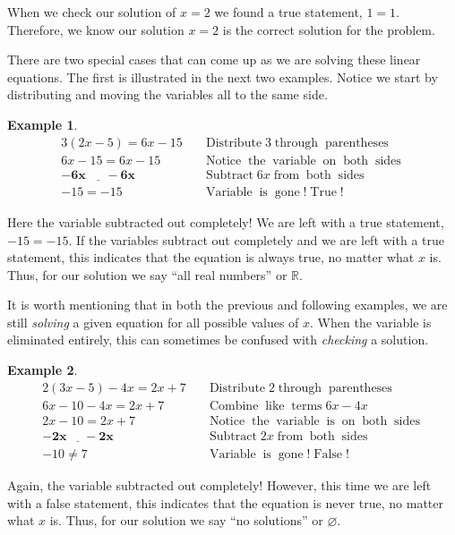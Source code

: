 \documentclass[12pt]{book}
\theoremstyle{definition}
\newtheorem{example}{Example}
\newcommand{\tmmathbf}[1]{\ensuremath{\boldsymbol{#1}}}
\newcommand{\tmop}[1]{\ensuremath{\operatorname{#1}}}
\begin{document}
When we check our solution of $x = 2$ we found a true statement, $1 = 1$. Therefore, we know our solution $x = 2$ is the correct solution for the problem.\par
There are two special cases that can come up as we are solving these linear equations. The first is illustrated in the next two examples. Notice we start by distributing and moving the variables all to the same side.\par
\begin{example}\label{Lin27}
  \begin{eqnarray*}
    3 (2 x - 5) = 6 x - 15 &  & \tmop{Distribute} 3 \tmop{through}
    \tmop{parentheses}\\
    6 x - 15 = 6 x - 15 &  & \tmop{Notice} \tmop{the} \tmop{variable}
    \tmop{on} \tmop{both} \tmop{sides}\\
    \tmmathbf{\underline{- 6 x ~~~~~~~- 6 x}}~~~~~~  &  & \tmop{Subtract} 6 x \tmop{from}
    \tmop{both} \tmop{sides}\\
    - 15 = - 15 &  & \tmop{Variable} \tmop{is} \tmop{gone} ! \tmop{True} !
  \end{eqnarray*}
\end{example}
Here the variable subtracted out completely! We are left with a true statement, $- 15 = - 15$. If the variables subtract out completely and we
  are left with a true statement, this indicates that the equation is always true, no matter what $x$ is. Thus, for our solution we say ``all real numbers'' or $\mathbb{R}$.\par

It is worth mentioning that in both the previous and following examples, we are still \textit{solving} a given equation for all possible values of $x$.  When the variable is eliminated entirely, this can sometimes be confused with \textit{checking} a solution.

\begin{example}\label{Lin28}
  \begin{eqnarray*}
    2 (3 x - 5) - 4 x = 2 x + 7 &  & \tmop{Distribute} 2 \tmop{through}
    \tmop{parentheses}\\
    6 x - 10 - 4 x = 2 x + 7 &  & \tmop{Combine} \tmop{like} \tmop{terms} 6 x
    - 4 x\\
    2 x - 10 = 2 x + 7 &  & \tmop{Notice} \tmop{the} \tmop{variable} \tmop{is}
    \tmop{on} \tmop{both} \tmop{sides}\\
    \tmmathbf{\underline{- 2 x ~~~~~~- 2 x} }~~~~~  &  & \tmop{Subtract} 2 x \tmop{from}
    \tmop{both} \tmop{sides}\\
    - 10 \neq 7 &  & \tmop{Variable} \tmop{is} \tmop{gone} ! \tmop{False} !
  \end{eqnarray*}
\end{example}
Again, the variable subtracted out completely! However, this time we are left with a false statement, this indicates that the equation is never true, no matter what $x$ is. Thus, for our solution we say ``no solutions'' or $\varnothing$.
\end{document}
